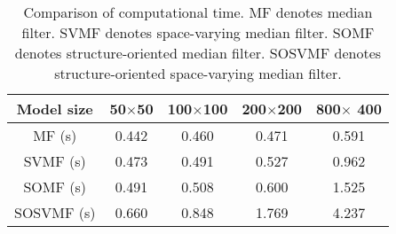 \begin{table}[!ht]
    \begin{center}
     \begin{tabular}{|c|c|c|c|c|} 
	  \hline Model size & 50$\times$50  &  100$\times$100 & 200$\times$200 & 800$\times$ 400\\ 
	  \hline MF (s) & 0.442 & 0.460 & 0.471 & 0.591\\
      \hline SVMF (s) & 0.473	& 0.491	   & 0.527   & 0.962	 \\ 
      \hline SOMF (s) & 0.491 & 0.508 	&0.600	 & 1.525\\
      \hline SOSVMF (s) & 0.660  & 0.848 	&1.769	 & 4.237\\
      \hline
    \end{tabular} 
   \end{center}
  \caption{Comparison of computational time. MF denotes median filter. SVMF denotes space-varying median filter. SOMF denotes structure-oriented median filter. SOSVMF denotes structure-oriented space-varying median filter.}
   \label{tbl:time}
\end{table}



